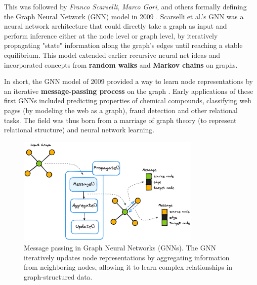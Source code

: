 \documentclass{article}
\begin{document}
This was followed by \textit{Franco Scarselli}, \textit{Marco Gori}, and others formally defining the Graph Neural Network (GNN) model in 2009 \cite{scarselli2009graph}.
Scarselli et al.’s GNN was a neural network architecture that could directly take a graph as input and perform inference either at the node level or graph level, by iteratively propagating "state" information along the graph’s edges until reaching a stable equilibrium.
This model extended earlier recursive neural net ideas and incorporated concepts from \textbf{random walks} and \textbf{Markov chains} on graphs.

In short, the GNN model of 2009 provided a way to learn node representations by an iterative \textbf{message-passing process} on the graph \cite{rizvi2022fimp}.
Early applications of these first GNNs included predicting properties of chemical compounds, classifying web pages (by modeling the web as a graph), fraud detection and other relational tasks.
The field was thus born from a marriage of graph theory (to represent relational structure) and neural network learning.

\begin{figure}[ht]
      \centering
      \includegraphics[width=0.8\textwidth]{../assets/gnn-message-passing.png}
      \caption{Message passing in Graph Neural Networks (GNNs).
            The GNN iteratively updates node representations by aggregating information from neighboring nodes, allowing it to learn complex relationships in graph-structured data.}
      \label{fig:gnn-message-passing}
\end{figure}




\end{document}
